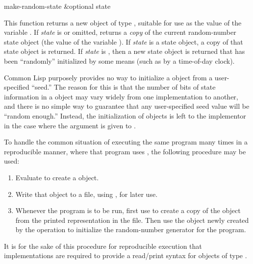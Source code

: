 \begin{defun}[Function]
make-random-state &optional state

This function returns a new object of type ,
suitable for use as the value of the variable .
If {\it state} is {\false} or omitted,  returns a {\it copy}
of the current random-number state object (the value of
the variable ).  If {\it state} is a state object,
a copy of that state object is returned.  If {\it state} is {\true},
then a new state object is returned that has been ``randomly''
initialized by some means (such as by a time-of-day clock).

\beforenoterule
\begin{rationale}
Common Lisp purposely provides no way to initialize a 
object from a user-specified ``seed.''  The reason for this is that
the number of bits of state information in a  object
may vary widely from one implementation to another, and there is no
simple way to guarantee that any user-specified seed value will be
``random enough.''  Instead, the initialization of 
objects is left to the implementor in the case where the argument {\true}
is given to .

To handle the common situation of executing the same program many times
in a reproducible manner, where that program uses , the following
procedure may be used:
\begin{enumerate}
\item
Evaluate  to create a  object.

\item
Write that object to a file, using , for later use.

\item
Whenever the program is to be run, first use  to create
a copy of the  object from the printed representation
in the file.
Then use the  object newly created by the  operation
to initialize the random-number generator for the program.
\end{enumerate}
It is for the sake of this procedure for reproducible execution that
implementations are required to provide a read/print syntax for objects
of type .


\end{rationale}
\end{defun}
